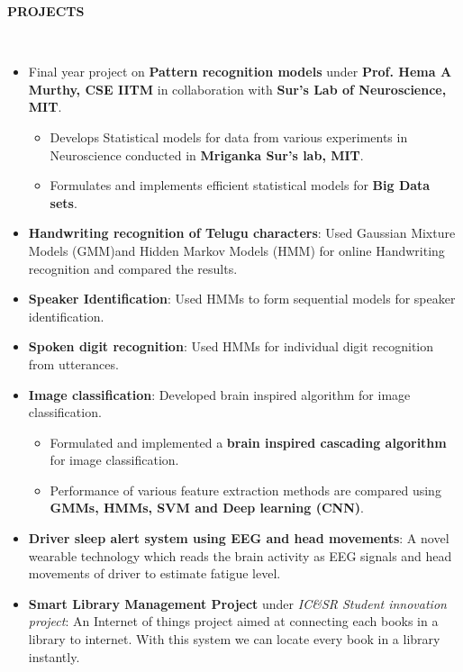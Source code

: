 \documentclass[a4paper,10pt]{article}
\newcommand{\lsep}{-0.5cm}
\newcommand{\resheading}[1]{{\small \colorbox{mygrey}{\begin{minipage}{0.975\textwidth}{\textbf{#1 \vphantom{p\^{E}}}}\end{minipage}}}}
\begin{document}
\resheading{\textbf{PROJECTS} }\\[\lsep]
    \begin{itemize}
        \vspace{3pt}
        \item Final year project on \textbf{Pattern recognition models} under \textbf{Prof. Hema A Murthy, CSE IITM} in collaboration with \textbf{Sur's Lab of Neuroscience, MIT}.
        \begin{itemize}
            \vspace{-5pt}
            \item Develops Statistical models for data from various experiments in Neuroscience conducted in \textbf{Mriganka Sur's lab, MIT}.
            \item Formulates and implements efficient statistical models for \textbf{Big Data sets}.
            \vspace{-5pt}
        \end{itemize}        
        \item \textbf{Handwriting recognition of Telugu characters}: Used Gaussian Mixture Models (GMM)and Hidden Markov Models (HMM) for online Handwriting recognition and compared the results.
        \vspace{-5pt}
        \item \textbf{Speaker Identification}: Used HMMs to form sequential models for speaker identification.
        \vspace{-5pt}
        \item \textbf{Spoken digit recognition}: Used HMMs for individual digit recognition from utterances. 
        \vspace{-5pt}
        \item \textbf{Image classification}: Developed brain inspired algorithm for image classification.
        \begin{itemize}
        \vspace{-5pt}
            \item Formulated and implemented a \textbf{brain inspired cascading algorithm} for image classification.
            \item Performance of various feature extraction methods are compared using \textbf{GMMs, HMMs, SVM and Deep learning (CNN)}.
            \vspace{-5pt}           
        \end{itemize}
        \item \textbf{Driver sleep alert system using EEG and head movements}: A novel wearable technology which reads the brain activity as EEG signals and head movements of driver to estimate fatigue level.\vspace{-5pt}
        \item \textbf{Smart Library Management Project} under \textit{IC\&SR Student innovation project}: An Internet of things project aimed at connecting each books in a library to internet. With this system we can locate every book in a library instantly.
    \end{itemize}
\end{document}
